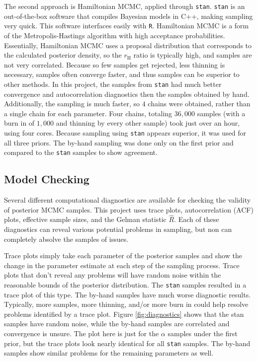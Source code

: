 \documentclass[11pt]{article}
\newcommand{\code}{\texttt}
\begin{document}
The second approach is Hamiltonian MCMC, applied through \code{stan}. \code{stan} is an out-of-the-box software that compiles Bayesian models in C++, making sampling very quick. This software interfaces easily with \code{R}. Hamiltonian MCMC is a form of the Metropolis-Hastings algorithm with high acceptance probabilities. Essentially, Hamiltonian MCMC uses a proposal distribution that corresponds to the calculated posterior density, so the $r_{\text{H}}$ ratio is typically high, and samples are not very correlated. Because so few samples get rejected, less thinning is necessary, samples often converge faster, and thus samples can be superior to other methods. In this project, the samples from \code{stan} had much better convergence and autocorrelation diagnostics then the samples obtained by hand. Additionally, the sampling is much faster, so $4$ chains were obtained, rather than a single chain for each parameter. Four chains, totaling $36{,}000$ samples (with a burn in of $1{,}000$ and thinning by every other sample) took just over an hour, using four cores. Because sampling using \code{stan} appears superior, it was used for all three priors. The by-hand sampling was done only on the first prior and compared to the \code{stan} samples to show agreement. 

\vspace*{-.5\baselineskip}
\subsection{Model Checking}\label{sec:diag}


Several different computational diagnostics are available for checking the validity of posterior MCMC samples. This project uses trace plots, autocorrelation (ACF) plots, effective sample sizes, and the Gelman statistic $\hat{R}$. Each of these diagnostics can reveal various potential problems in sampling, but non can completely absolve the samples of issues. 

Trace plots simply take each parameter of the posterior samples and show the change in the parameter estimate at each step of the sampling process. Trace plots that don't reveal any problems will have random noise within the reasonable bounds of the posterior distribution. The \code{stan} samples resulted in a trace plot of this type. The by-hand samples have much worse diagnostic results. Typically, more samples, more thinning, and/or more burn in could help resolve problems identified by a trace plot. Figure \ref{fig:diagnostics} shows that the stan samples have random noise, while the by-hand samples are correlated and convergence is unsure. The plot here is just for the $\alpha$ samples under the first prior, but the trace plots look nearly identical for all \code{stan} samples. The by-hand samples show similar problems for the remaining parameters as well.
\end{document}
